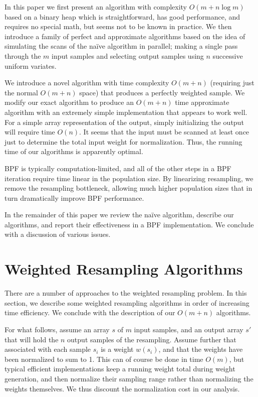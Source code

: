 \documentclass[12pt]{article}
\begin{document}
  In this paper we first present an algorithm with
  complexity $O(m + n \log m)$ based on a binary heap which
  is straightforward, has good performance, and requires
  no special math, but seems not to be known in practice.
  We then introduce a family of perfect and approximate
  algorithms based on the idea of simulating the scans of
  the na\"ive algorithm in parallel; making a single pass
  through the $m$ input samples and selecting output samples
  using $n$ successive uniform variates.

  We introduce a novel algorithm with time complexity $O(m +
  n)$ (requiring just the normal $O(m + n)$ space) that
  produces a perfectly weighted sample.  We modify our exact
  algorithm to produce an $O(m + n)$ time approximate
  algorithm with an extremely simple implementation that
  appears to work well.  For a simple array representation
  of the output, simply initializing the output will require
  time $O(n)$.  It seems that the input must be scanned at
  least once just to determine the total input weight for
  normalization.  Thus, the running time of our algorithms
  is apparently optimal.

  BPF is typically computation-limited, and all of the other
  steps in a BPF iteration require time linear in the
  population size.  By linearizing resampling, we remove the
  resampling bottleneck, allowing much higher population
  sizes that in turn dramatically improve BPF performance.

  In the remainder of this paper we review the na\"ive
  algorithm, describe our algorithms, and report their
  effectiveness in a BPF implementation.  We conclude with a
  discussion of various issues.

\section{Weighted Resampling Algorithms}

  There are a number of approaches to the weighted
  resampling problem.  In this section, we describe some
  weighted resampling algorithms in order of increasing time
  efficiency.  We conclude with the description of our
  $O(m + n)$ algorithms.

  For what follows, assume an array $s$ of $m$ input
  samples, and an output array $s'$ that will hold the $n$
  output samples of the resampling.  Assume further that
  associated with each sample $s_i$ is a weight $w(s_i)$,
  and that the weights have been normalized to sum to 1.
  This can of course be done in time $O(m)$, but typical
  efficient implementations keep a running weight total
  during weight generation, and then normalize their
  sampling range rather than normalizing the weights
  themselves.  We thus discount the normalization cost in
  our analysis.
\end{document}
